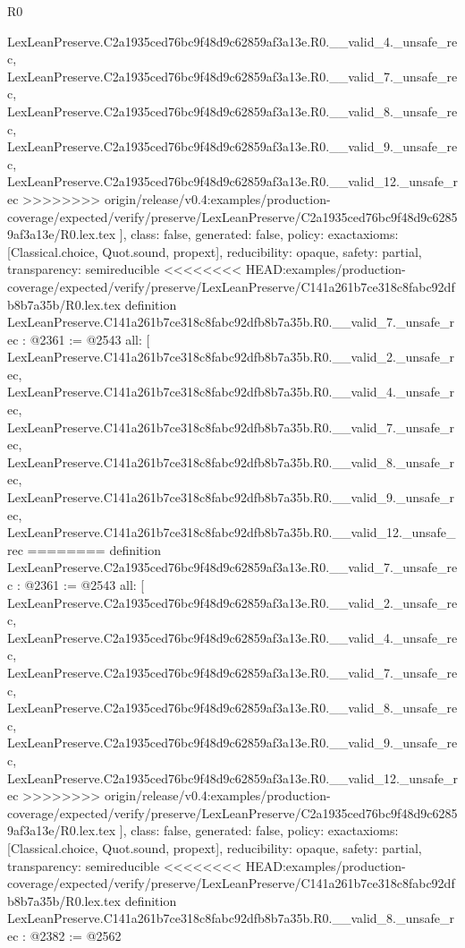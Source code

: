 \begin{lexlean}{R0}
\begin{coremodule}
{{{{{{{{{{{{{{{{{{{{{{{{{{{{{{{{{{{{{{{{{{{{{{{{{{{{    LexLeanPreserve.C2a1935ced76bc9f48d9c62859af3a13e.R0.__valid_4._unsafe_rec,
    LexLeanPreserve.C2a1935ced76bc9f48d9c62859af3a13e.R0.__valid_7._unsafe_rec,
    LexLeanPreserve.C2a1935ced76bc9f48d9c62859af3a13e.R0.__valid_8._unsafe_rec,
    LexLeanPreserve.C2a1935ced76bc9f48d9c62859af3a13e.R0.__valid_9._unsafe_rec,
    LexLeanPreserve.C2a1935ced76bc9f48d9c62859af3a13e.R0.__valid_12._unsafe_rec
>>>>>>>> origin/release/v0.4:examples/production-coverage/expected/verify/preserve/LexLeanPreserve/C2a1935ced76bc9f48d9c62859af3a13e/R0.lex.tex
  ],
  class: false,
  generated: false,
  policy: exact{axioms: [Classical.choice, Quot.sound, propext]},
  reducibility: opaque{},
  safety: partial,
  transparency: semireducible
}
<<<<<<<< HEAD:examples/production-coverage/expected/verify/preserve/LexLeanPreserve/C141a261b7ce318c8fabc92dfb8b7a35b/R0.lex.tex
definition LexLeanPreserve.C141a261b7ce318c8fabc92dfb8b7a35b.R0.__valid_7._unsafe_rec : @2361 := @2543 {
  all: [
    LexLeanPreserve.C141a261b7ce318c8fabc92dfb8b7a35b.R0.__valid_2._unsafe_rec,
    LexLeanPreserve.C141a261b7ce318c8fabc92dfb8b7a35b.R0.__valid_4._unsafe_rec,
    LexLeanPreserve.C141a261b7ce318c8fabc92dfb8b7a35b.R0.__valid_7._unsafe_rec,
    LexLeanPreserve.C141a261b7ce318c8fabc92dfb8b7a35b.R0.__valid_8._unsafe_rec,
    LexLeanPreserve.C141a261b7ce318c8fabc92dfb8b7a35b.R0.__valid_9._unsafe_rec,
    LexLeanPreserve.C141a261b7ce318c8fabc92dfb8b7a35b.R0.__valid_12._unsafe_rec
========
definition LexLeanPreserve.C2a1935ced76bc9f48d9c62859af3a13e.R0.__valid_7._unsafe_rec : @2361 := @2543 {
  all: [
    LexLeanPreserve.C2a1935ced76bc9f48d9c62859af3a13e.R0.__valid_2._unsafe_rec,
    LexLeanPreserve.C2a1935ced76bc9f48d9c62859af3a13e.R0.__valid_4._unsafe_rec,
    LexLeanPreserve.C2a1935ced76bc9f48d9c62859af3a13e.R0.__valid_7._unsafe_rec,
    LexLeanPreserve.C2a1935ced76bc9f48d9c62859af3a13e.R0.__valid_8._unsafe_rec,
    LexLeanPreserve.C2a1935ced76bc9f48d9c62859af3a13e.R0.__valid_9._unsafe_rec,
    LexLeanPreserve.C2a1935ced76bc9f48d9c62859af3a13e.R0.__valid_12._unsafe_rec
>>>>>>>> origin/release/v0.4:examples/production-coverage/expected/verify/preserve/LexLeanPreserve/C2a1935ced76bc9f48d9c62859af3a13e/R0.lex.tex
  ],
  class: false,
  generated: false,
  policy: exact{axioms: [Classical.choice, Quot.sound, propext]},
  reducibility: opaque{},
  safety: partial,
  transparency: semireducible
}
<<<<<<<< HEAD:examples/production-coverage/expected/verify/preserve/LexLeanPreserve/C141a261b7ce318c8fabc92dfb8b7a35b/R0.lex.tex
definition LexLeanPreserve.C141a261b7ce318c8fabc92dfb8b7a35b.R0.__valid_8._unsafe_rec : @2382 := @2562 {
}}}}}}}}}}}}}}}}}}}}}}}}}}}}}}}}}}}}}}}}}}}}}}}}}}}}}
\end{coremodule}
\end{lexlean}
